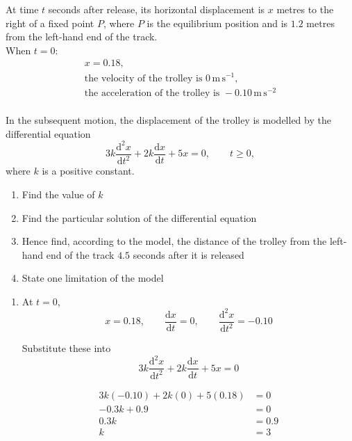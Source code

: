 \documentclass[leqno]{article}
\begin{document}
\begin{enumerate}[
  label=\textbf{\arabic*.},
  leftmargin=*,
  topsep=0pt,
  partopsep=0pt,
  parsep=0pt
]
At time $t$ seconds after release, its horizontal displacement is $x$ metres to the right of a fixed point $P$, where $P$ is the equilibrium position and is $1.2$ metres from the left-hand end of the track. \\

When $t=0$:
\[
\renewcommand{\arraystretch}{1.2}
\begin{array}{l}
x=0.18,\\
\text{the velocity of the trolley is }0\,\mathrm{m\,s^{-1}},\\
\text{the acceleration of the trolley is }-0.10\,\mathrm{m\,s^{-2}}
\end{array}
\] \\
In the subsequent motion, the displacement of the trolley is modelled by the differential equation
\[
3k\frac{\mathrm{d}^2 x}{\mathrm{d} t^2}+2k\frac{\mathrm{d} x}{\mathrm{d} t}+5x=0,\qquad t\ge 0,
\]
where $k$ is a positive constant. \\

\begin{enumerate}[label=\textbf{(\alph*)}]
  \item Find the value of $k$  \\
  \item Find the particular solution of the differential equation  \\
  \item Hence find, according to the model, the distance of the trolley from the left-hand end of the track $4.5$ seconds after it is released  \\
  \item State one limitation of the model  \\
\end{enumerate}

\vspace*{30pt}

\begin{tcolorbox}[colback=white, colframe=scarlet, title={\textbf{Solution}}, breakable, grow to left by=6mm, grow to right by=10mm]
\begin{enumerate}[label=\textbf{(\alph*)}]
  \item At $t=0$,
\[
x=0.18,\qquad \frac{\mathrm{d}x}{\mathrm{d}t}=0,\qquad \frac{\mathrm{d}^2x}{\mathrm{d}t^2}=-0.10
\]

Substitute these into
\[
3k\frac{\mathrm{d}^2x}{\mathrm{d}t^2}+2k\frac{\mathrm{d}x}{\mathrm{d}t}+5x=0
\]

\begin{align*}
3k(-0.10)+2k(0)+5(0.18)&=0\\
-0.3k+0.9&=0\\
0.3k&=0.9\\
k&=3
\end{align*}


\end{enumerate}
\end{tcolorbox}
\end{enumerate}
\end{document}
